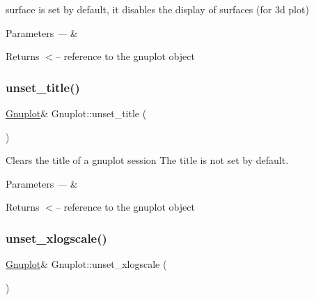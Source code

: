 surface is set by default, it disables the display of surfaces (for 3d plot)


\begin{DoxyParams}{Parameters}
{\em ---} & \\
\hline
\end{DoxyParams}
\begin{DoxyReturn}{Returns}
$<$-- reference to the gnuplot object 
\end{DoxyReturn}
\mbox{\label{classGnuplot_aca0aeb1dc0ac8d7e68ba6a15a977be28}} 
\subsubsection{\texorpdfstring{unset\+\_\+title()}{unset\_title()}}
{\footnotesize\ttfamily \hyperlink{classGnuplot}{Gnuplot}\& Gnuplot\+::unset\+\_\+title (\begin{DoxyParamCaption}{ }\end{DoxyParamCaption})\hspace{0.3cm}{\ttfamily [inline]}}



Clears the title of a gnuplot session The title is not set by default. 


\begin{DoxyParams}{Parameters}
{\em ---} & \\
\hline
\end{DoxyParams}
\begin{DoxyReturn}{Returns}
$<$-- reference to the gnuplot object 
\end{DoxyReturn}
\mbox{\label{classGnuplot_a7b178184260f1498cd0c11a197ea0ac2}} 
\subsubsection{\texorpdfstring{unset\+\_\+xlogscale()}{unset\_xlogscale()}}
{\footnotesize\ttfamily \hyperlink{classGnuplot}{Gnuplot}\& Gnuplot\+::unset\+\_\+xlogscale (\begin{DoxyParamCaption}{ }\end{DoxyParamCaption})\hspace{0.3cm}{\ttfamily [inline]}}

